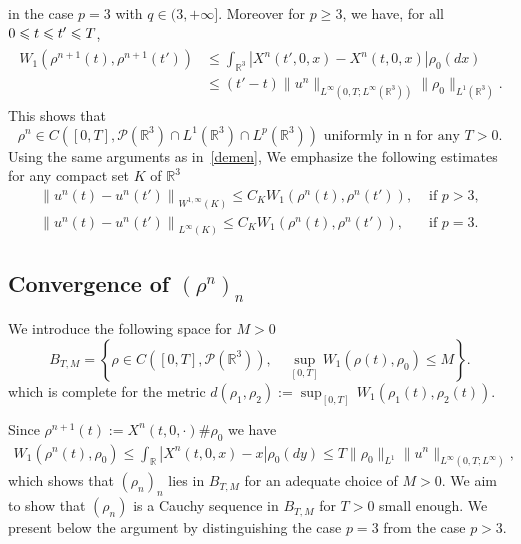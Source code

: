\documentclass[AHL,Unicode,longabstracts,published]{cedram}
\newcommand{\R}{\mathbb{R}}
\newcommand{\clP}{\mathcal{P}}
\renewcommand{\leq}{\leqslant}
\renewcommand{\geq}{\geqslant}
\begin{document}
in the case $p=3$ with $q\in(3,+\infty]$. Moreover for $p\geq3$, we have, for all $0 \leq t \leq t'\linebreak \leq T$,
\begin{align}\label{continuite_rho_n}
\begin{split}
W_1\left(\rho^{n+1}(t),\rho^{n+1}(t')\right) &\leq \int_{\R^3}\left|X^n(t',0,x)-X^n(t,0,x)\right| \rho_0(dx)\\
&\leq (t'-t) \|u^n\|_{L^\infty\left(0,T;L^\infty(\R^3)\right)} \|\rho_0\|_{L^1(\R^3)}.
\end{split}
\end{align}
This shows that
\[
\rho^{n} \in C\left([0,T],\clP\left(\R^3\right)\cap L^1\left(\R^3\right)\cap L^p\left(\R^3\right)\right) \text{ uniformly in n for any }T>0.
\]
Using the same arguments as in~\eqref{demen}, We emphasize the following estimates for any compact set $K$ of $\R^3$
\begin{align}
\left\|u^n(t)-u^n(t')\right\|_{W^{1,\infty}(K)}\leq C_K W_1\left(\rho^n(t),\rho^n(t')\right),& \text{ if } p>3,\label{equiconinuity_u^n(t),p>3}
\\
\left\|u^n(t)-u^n(t')\right\|_{L^{\infty}(K)}\leq C_K W_1\left(\rho^n(t),\rho^n(t')\right),& \text{ if } p=3 \label{equiconinuity_u^n(t),p=3}
.
\end{align}

\subsection{Convergence of \texorpdfstring{$(\rho^n)_{n}$}{(rhon)n}}

We introduce the following space for $M>0$
\begin{equation*}
B_{T,M}=\left\{\rho \in C\left([0,T], \clP\left(\R^3\right)\right), \quad
\underset{[0,T]}{\sup}W_1(\rho(t),\rho_0) \leq M \right\}.
\end{equation*}
which is complete for the metric $d(\rho_1,\rho_2):={\sup}_{[0,T]}\,W_1(\rho_1(t),\rho_2(t)) $.

Since $\rho^{n+1}(t):=X^n(t,0,\cdot)\#\rho_0 $ we have
\begin{align*}
W_1\left(\rho^n(t),\rho_0\right) \leq \int_{\R}|X^n(t,0,x)-x|\rho_0(dy) \leq T \|\rho_0\|_{L^1} \|u^n \|_{L^\infty(0,T;L^\infty)},
\end{align*}
which shows that $(\rho_n)_n$ lies in $B_{T,M}$ for an adequate choice of $M>0$. We aim to show that $(\rho_n)$ is a Cauchy sequence in $B_{T,M}$ for $T>0$ small enough. We present below the argument by distinguishing the case $p=3$ from the case $p>3$.
\end{document}
